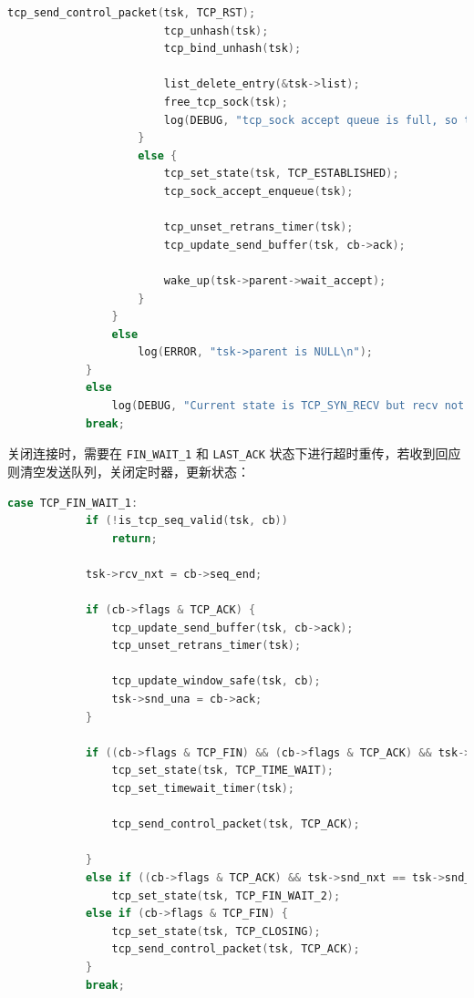 \documentclass[UTF8]{report}
\begin{document}
\begin{enumerate}
\begin{lstlisting}[language=C]
                        tcp_send_control_packet(tsk, TCP_RST);
                        tcp_unhash(tsk);
                        tcp_bind_unhash(tsk);

                        list_delete_entry(&tsk->list);
                        free_tcp_sock(tsk);
                        log(DEBUG, "tcp_sock accept queue is full, so the tsk should be freed.");
                    } 
                    else {
                        tcp_set_state(tsk, TCP_ESTABLISHED);
                        tcp_sock_accept_enqueue(tsk);

                        tcp_unset_retrans_timer(tsk);
                        tcp_update_send_buffer(tsk, cb->ack);

                        wake_up(tsk->parent->wait_accept);
                    }
                }
                else
                    log(ERROR, "tsk->parent is NULL\n");
            }
            else
                log(DEBUG, "Current state is TCP_SYN_RECV but recv not ACK");
            break;
    \end{lstlisting}

    关闭连接时，需要在 \texttt{FIN\_WAIT\_1} 和 \texttt{LAST\_ACK} 状态下进行超时重传，若收到回应则清空发送队列，关闭定时器，更新状态：

    \begin{lstlisting}[language=C]
        case TCP_FIN_WAIT_1: 
            if (!is_tcp_seq_valid(tsk, cb))
                return;

            tsk->rcv_nxt = cb->seq_end;

            if (cb->flags & TCP_ACK) {
                tcp_update_send_buffer(tsk, cb->ack);
                tcp_unset_retrans_timer(tsk);

                tcp_update_window_safe(tsk, cb);
                tsk->snd_una = cb->ack;
            }

            if ((cb->flags & TCP_FIN) && (cb->flags & TCP_ACK) && tsk->snd_nxt == tsk->snd_una) {
                tcp_set_state(tsk, TCP_TIME_WAIT);
                tcp_set_timewait_timer(tsk);

                tcp_send_control_packet(tsk, TCP_ACK);

            }
            else if ((cb->flags & TCP_ACK) && tsk->snd_nxt == tsk->snd_una) 
                tcp_set_state(tsk, TCP_FIN_WAIT_2);
            else if (cb->flags & TCP_FIN) {
                tcp_set_state(tsk, TCP_CLOSING);
                tcp_send_control_packet(tsk, TCP_ACK);
            }
            break;


\end{lstlisting}
\end{enumerate}
\end{document}
